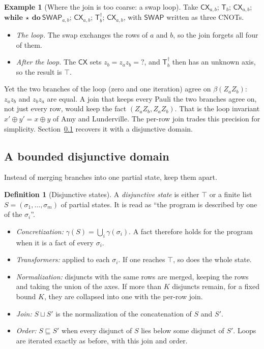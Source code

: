 \documentclass[11pt]{article}
\theoremstyle{definition}
\newtheorem{definition}[theorem]{Definition}
\newtheorem{example}[theorem]{Example}
\theoremstyle{remark}
\newcommand{\adj}{^{\dagger}}
\newcommand{\gam}{\gamma}
\newcommand{\back}{\beta}
\newcommand{\gate}[1]{\mathsf{#1}}
\begin{document}
\begin{example}[Where the join is too coarse: a swap loop]\label{ex:swap-loop}
Take $\gate{CX}_{a,b}$; $\gate T_b$; $\gate{CX}_{a,b}$;
$\textbf{while}\ \star\ \textbf{do}\ \mathsf{SWAP}_{a,b}$; $\gate{CX}_{a,b}$; $\gate T\adj_b$;
$\gate{CX}_{a,b}$, with $\mathsf{SWAP}$ written as three CNOTs.
\begin{itemize}[nosep]
  \item \emph{The loop.} The swap exchanges the rows of $a$ and $b$, so the join forgets all
  four of them.
  \item \emph{After the loop.} The $\gate{CX}$ sets $z_b = z_a z_b = ?$, and $\gate T\adj_b$
  then has an unknown axis, so the result is $\top$.
\end{itemize}
Yet the two branches of the loop (zero and one iteration) agree on $\back(Z_aZ_b)$:
$z_a z_b$ and $z_b z_a$ are equal. A join that keeps every Pauli the two branches agree
on, not just every row, would keep the fact $(Z_aZ_b, Z_aZ_b)$. That is the loop invariant
$x' \oplus y' = x \oplus y$ of Amy and Lunderville. The per-row join trades this precision
for simplicity. Section~\ref{sec:disj} recovers it with a disjunctive domain.
\end{example}

\subsection{A bounded disjunctive domain}\label{sec:disj}

Instead of merging branches into one partial state, keep them apart.

\begin{definition}[Disjunctive states]
A \emph{disjunctive state} is either $\top$ or a finite list $S = (\sigma_1, \dots, \sigma_m)$
of partial states. It is read as ``the program is described by one of the $\sigma_i$''.
\begin{itemize}[nosep]
  \item \emph{Concretization:} $\gam(S) = \bigcup_i \gam(\sigma_i)$. A fact therefore holds
  for the program when it is a fact of every $\sigma_i$.
  \item \emph{Transformers:} applied to each $\sigma_i$. If one reaches $\top$, so does the
  whole state.
  \item \emph{Normalization:} disjuncts with the same rows are merged, keeping the rows and
  taking the union of the axes. If more than $K$ disjuncts remain, for a fixed bound $K$,
  they are collapsed into one with the per-row join.
  \item \emph{Join:} $S \sqcup S'$ is the normalization of the concatenation of $S$ and
  $S'$.
  \item \emph{Order:} $S \sqsubseteq S'$ when every disjunct of $S$ lies below some
  disjunct of $S'$. Loops are iterated exactly as before, with this join and order.
\end{itemize}
\end{definition}
\end{document}
